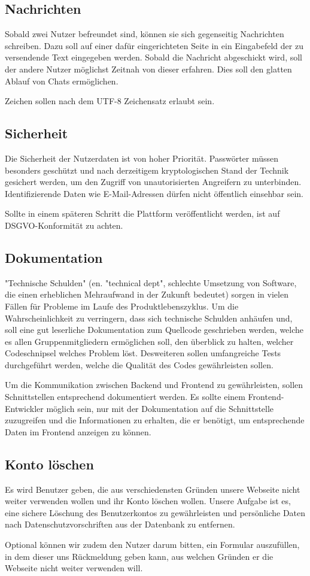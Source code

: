 \subsection{Nachrichten}
Sobald zwei Nutzer befreundet sind, können sie sich gegenseitig Nachrichten schreiben. Dazu soll auf einer dafür eingerichteten Seite in ein Eingabefeld der zu versendende Text eingegeben werden. Sobald die Nachricht abgeschickt wird, soll der andere Nutzer möglichst Zeitnah von dieser erfahren. Dies soll den glatten Ablauf von Chats ermöglichen.

Zeichen sollen nach dem UTF-8 Zeichensatz erlaubt sein.

\subsection{Sicherheit}
Die Sicherheit der Nutzerdaten ist von hoher Priorität. Passwörter müssen besonders geschützt und nach derzeitigem kryptologischen Stand der Technik gesichert werden, um den Zugriff von unautorisierten Angreifern zu unterbinden. Identifizierende Daten wie E-Mail-Adressen dürfen nicht öffentlich einsehbar sein.

Sollte in einem späteren Schritt die Plattform veröffentlicht werden, ist auf DSGVO-Konformität zu achten.

\subsection{Dokumentation}
"Technische Schulden" (en. "technical dept", schlechte Umsetzung von Software, die einen erheblichen Mehraufwand in der Zukunft bedeutet) sorgen in vielen Fällen für Probleme im Laufe des Produktlebenszyklus. Um die Wahrscheinlichkeit zu verringern, dass sich technische Schulden anhäufen und, soll eine gut leserliche Dokumentation zum Quellcode geschrieben werden, welche es allen Gruppenmitgliedern ermöglichen soll, den überblick zu halten, welcher Codeschnipsel welches Problem löst. Desweiteren sollen umfangreiche Tests durchgeführt werden, welche die Qualität des Codes gewährleisten sollen.

Um die Kommunikation zwischen Backend und Frontend zu gewährleisten, sollen Schnittstellen entsprechend dokumentiert werden. Es sollte einem Frontend-Entwickler möglich sein, nur mit der Dokumentation auf die Schnittstelle zuzugreifen und die Informationen zu erhalten, die er benötigt, um entsprechende Daten im Frontend anzeigen zu können.

\subsection{Konto löschen}
Es wird Benutzer geben, die aus verschiedensten Gründen unsere Webseite nicht weiter verwenden wollen und ihr Konto löschen wollen. Unsere Aufgabe ist es, eine sichere Löschung des Benutzerkontos zu gewährleisten und persönliche Daten nach Datenschutzvorschriften aus der Datenbank zu entfernen.

Optional können wir zudem den Nutzer darum bitten, ein Formular auszufüllen, in dem dieser uns Rückmeldung geben kann, aus welchen Gründen er die Webseite nicht weiter verwenden will.
